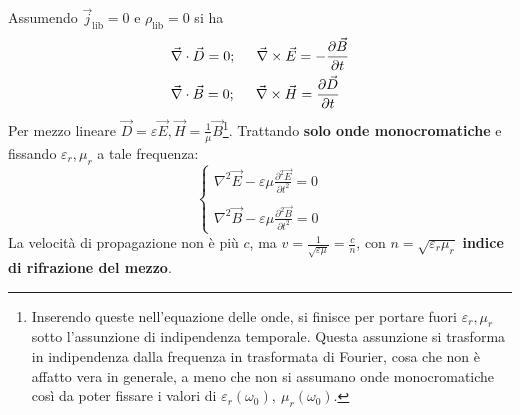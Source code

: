 \documentclass[a4paper]{scrartcl}
\numberwithin{equation}{subsection}
\theoremstyle{style1}
\begin{document}
Assumendo $\vec{j}_\text{lib}=0$ e $\rho _{\text{lib}} =0$ si ha
\begin{equation}
	\begin{split}
		&\vec{\nabla }\cdot \vec{D}=0;\hspace{.5cm} \vec{\nabla }\times \vec{E}= - \frac{\partial \vec{B}}{\partial t} \\
		&\vec{\nabla }\cdot \vec{B}=0 ;\hspace{.5cm} \vec{\nabla }\times \vec{H}= \frac{\partial \vec{D}}{\partial t} 
	\end{split}
\end{equation}
Per mezzo lineare $\vec{D}=\varepsilon \vec{E}, \vec{H}= \frac{1}{\mu }\vec{B}$\footnote{Inserendo queste nell'equazione delle onde, si finisce per portare fuori $\varepsilon _r, \mu _r$ sotto l'assunzione di indipendenza temporale. Questa assunzione si trasforma in indipendenza dalla frequenza in trasformata di Fourier, cosa che non \`e affatto vera in generale, a meno che non si assumano onde monocromatiche cos\`i da poter fissare i valori di $\varepsilon _r(\omega_0), \ \mu _r(\omega_0)$.}. Trattando \textbf{solo onde monocromatiche} e fissando $\varepsilon _r,\mu _r$ a tale frequenza:
\begin{equation}
	\begin{cases}
		\displaystyle \nabla ^2 \vec{E}-\varepsilon \mu  \frac{\partial ^2 \vec{E}}{\partial t^2} =0 \\
		\\
		\displaystyle \nabla ^2 \vec{B}-\varepsilon \mu \frac{\partial ^2\vec{B}}{\partial t^2} = 0 
	\end{cases}
\end{equation}
La velocit\`a di propagazione non \`e pi\`u $c$, ma $v = \frac{1}{\sqrt{\varepsilon \mu } }= \frac{c}{n}$, con $n=\sqrt{\varepsilon _r\mu _r} $ \textbf{indice di rifrazione del mezzo}.
\end{document}
